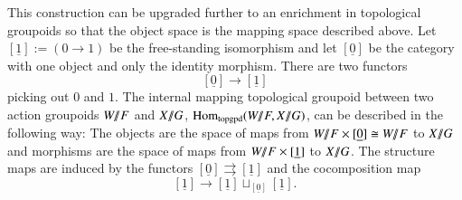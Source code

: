 This construction can be upgraded further to an enrichment in topological groupoids so that the object space is the mapping space described above. Let $[\underline{1}] := (0 \rightarrow 1)$ be the free-standing isomorphism and let $[\underline{0}]$ be the category with one object and only the identity morphism. There are two functors 
\[
[\underline{0}] \rightarrow [\underline{1}]
\]
picking out $0$ and $1$. The internal mapping topological groupoid between two action groupoids $W /\!\!/ F$ and $X/\!\!/ G$, $\text{Hom}_{\mathrm{top gpd}}(W /\!\!/ F, X /\!\!/ G)$, can be described in the following way: The objects are the space of maps from $W /\!\!/ F \times [\underline{0}] \cong W /\!\!/ F$ to $X /\!\!/ G$ and morphisms are the space of maps from $W /\!\!/ F \times [\underline{1}]$ to $X /\!\!/ G$. The structure maps are induced by the functors $[\underline{0}] \rightrightarrows [\underline{1}]$ and the cocomposition map
\[
[\underline{1}] \rightarrow [\underline{1}] \sqcup_{[\underline{0}]} [\underline{1}].
\]
%

